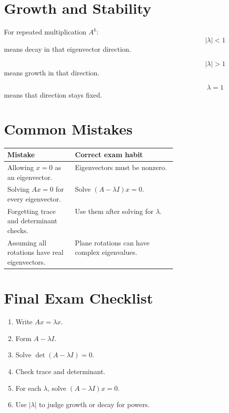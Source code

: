 \documentclass[10pt]{article}
\begin{document}
\section{Growth and Stability}

For repeated multiplication \(A^k\):
\[
|\lambda|<1
\]
means decay in that eigenvector direction.

\[
|\lambda|>1
\]
means growth in that direction.

\[
\lambda=1
\]
means that direction stays fixed.

\section{Common Mistakes}

\begin{center}
\small
\begin{tabularx}{\linewidth}{@{}L{0.40\linewidth}Y@{}}
\toprule
Mistake & Correct exam habit \\
\midrule
Allowing \(x=0\) as an eigenvector. & Eigenvectors must be nonzero. \\
Solving \(Ax=0\) for every eigenvector. & Solve \((A-\lambda I)x=0\). \\
Forgetting trace and determinant checks. & Use them after solving for \(\lambda\). \\
Assuming all rotations have real eigenvectors. & Plane rotations can have complex eigenvalues. \\
\bottomrule
\end{tabularx}
\end{center}

\section{Final Exam Checklist}

\begin{enumerate}
  \item Write \(Ax=\lambda x\).
  \item Form \(A-\lambda I\).
  \item Solve \(\det(A-\lambda I)=0\).
  \item Check trace and determinant.
  \item For each \(\lambda\), solve \((A-\lambda I)x=0\).
  \item Use \(|\lambda|\) to judge growth or decay for powers.
\end{enumerate}
\end{document}
